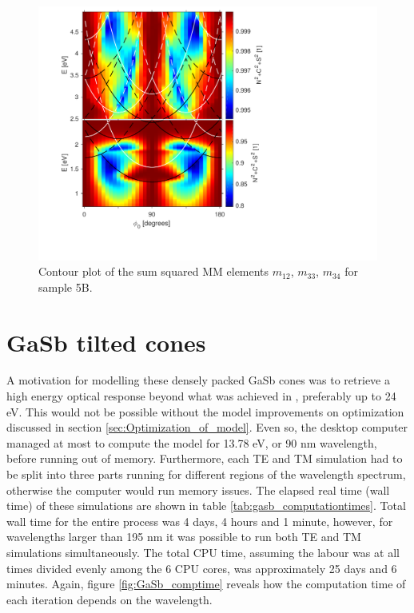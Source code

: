 \begin{figure}
    \centering
    \includegraphics[width=0.6\linewidth, trim=1.2cm  1.8cm 6.5cm 0.3cm, clip]{figures/ch4/S5B/NCS/sumNCSsquared_contour.pdf}
    \caption{Contour plot of the sum squared MM elements $m_{12}$, $m_{33}$, $m_{34}$ for sample 5B.}
\end{figure}

\section{GaSb tilted cones}
\label{sec:results_gasb}
A motivation for modelling these densely packed GaSb cones was to retrieve a high energy optical response beyond what was achieved in \cite{gasbcones}, preferably up to 24 eV. This would not be possible without the model improvements on optimization discussed in section \ref{sec:Optimization_of_model}. Even so, the desktop computer managed at most to compute the model for 13.78 eV, or 90 nm wavelength, before running out of memory. Furthermore, each TE and TM simulation had to be split into three parts running for different regions of the wavelength spectrum, otherwise the computer would run memory issues. The elapsed real time (wall time) of these simulations are shown in table \ref{tab:gasb_computationtimes}. Total wall time for the entire process was 4 days, 4 hours and 1 minute, however, for wavelengths larger than 195 nm it was possible to run both TE and TM simulations simultaneously. The total CPU time, assuming the labour was at all times divided evenly among the 6 CPU cores, was approximately 25 days and 6 minutes. Again, figure \ref{fig:GaSb_comptime} reveals how the computation time of each iteration depends on the wavelength.

